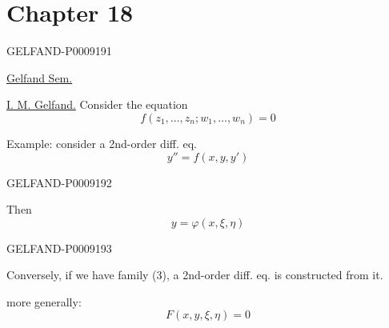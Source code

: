 \section*{Chapter 18}
\begin{GelfandAdjacentEvidence}{GELFAND-P000919}{1}

\qquad \uline{Gelfand Sem.}

\uline{I. M. Gelfand.} Consider the equation
\begin{equation*}
 f(z_1,\ldots,z_n;w_1,\ldots,w_n)=0
 \tag{1}
\end{equation*}

Example: consider a 2nd-order diff. eq.
\begin{equation*}
 y''=f(x,y,y')
 \tag{2}
\end{equation*}
\end{GelfandAdjacentEvidence}
\begin{GelfandAdjacentEvidence}{GELFAND-P000919}{2}


Then
\begin{equation*}
 y=\varphi(x,\xi,\eta)
 \tag{3}
\end{equation*}
\end{GelfandAdjacentEvidence}
\begin{GelfandAdjacentEvidence}{GELFAND-P000919}{3}


Conversely, if we have family (3), a 2nd-order diff. eq. is constructed from it.

more generally:
\begin{equation*}
 F(x,y,\xi,\eta)=0
 \tag{4}
\end{equation*}
\end{GelfandAdjacentEvidence}
